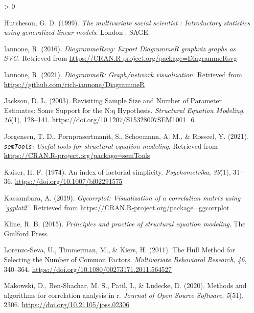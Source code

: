 \documentclass[
  english,
  man]{apa6}
\newlength{\cslhangindent}
\newenvironment{CSLReferences}[2] %
 {%
  \setlength{\parindent}{0pt}
  \ifodd #1 \everypar{\setlength{\hangindent}{\cslhangindent}}\ignorespaces\fi
  \ifnum #2 > 0
  \setlength{\parskip}{#2\baselineskip}
  \fi
 }%
 {}
\begin{document}
\begin{CSLReferences}{1}{0}
\leavevmode\hypertarget{ref-hutchesonMultivariateSocialScientist1999}{}%
Hutcheson, G. D. (1999). \emph{The multivariate social scientist : Introductory statistics using generalized linear models}. {London : SAGE}.

\leavevmode\hypertarget{ref-R-DiagrammeRsvg}{}%
Iannone, R. (2016). \emph{DiagrammeRsvg: Export DiagrammeR graphviz graphs as SVG}. Retrieved from \url{https://CRAN.R-project.org/package=DiagrammeRsvg}

\leavevmode\hypertarget{ref-R-DiagrammeR}{}%
Iannone, R. (2021). \emph{DiagrammeR: Graph/network visualization}. Retrieved from \url{https://github.com/rich-iannone/DiagrammeR}

\leavevmode\hypertarget{ref-jacksonRevisitingSampleSize2003}{}%
Jackson, D. L. (2003). Revisiting {Sample Size} and {Number} of {Parameter Estimates}: {Some Support} for the {N}:q {Hypothesis}. \emph{Structural Equation Modeling}, \emph{10}(1), 128--141. \url{https://doi.org/10.1207/S15328007SEM1001_6}

\leavevmode\hypertarget{ref-R-semTools}{}%
Jorgensen, T. D., Pornprasertmanit, S., Schoemann, A. M., \& Rosseel, Y. (2021). \emph{\texttt{semTools}: {U}seful tools for structural equation modeling}. Retrieved from \url{https://CRAN.R-project.org/package=semTools}

\leavevmode\hypertarget{ref-kaiserIndexFactorialSimplicity1974}{}%
Kaiser, H. F. (1974). An index of factorial simplicity. \emph{Psychometrika}, \emph{39}(1), 31--36. \url{https://doi.org/10.1007/bf02291575}

\leavevmode\hypertarget{ref-R-ggcorrplot}{}%
Kassambara, A. (2019). \emph{Ggcorrplot: Visualization of a correlation matrix using 'ggplot2'}. Retrieved from \url{https://CRAN.R-project.org/package=ggcorrplot}

\leavevmode\hypertarget{ref-klinePrinciplesPracticeStructural2015}{}%
Kline, R. B. (2015). \emph{Principles and practice of structural equation modeling}. {The Guilford Press}.

\leavevmode\hypertarget{ref-lorenzo-sevaHullMethodSelecting2011}{}%
Lorenzo-Seva, U., Timmerman, M., \& Kiers, H. (2011). The {Hull Method} for {Selecting} the {Number} of {Common Factors}. \emph{Multivariate Behavioral Research}, \emph{46}, 340--364. \url{https://doi.org/10.1080/00273171.2011.564527}

\leavevmode\hypertarget{ref-R-correlation}{}%
Makowski, D., Ben-Shachar, M. S., Patil, I., \& Lüdecke, D. (2020). Methods and algorithms for correlation analysis in r. \emph{Journal of Open Source Software}, \emph{5}(51), 2306. \url{https://doi.org/10.21105/joss.02306}


\end{CSLReferences}
\end{document}
